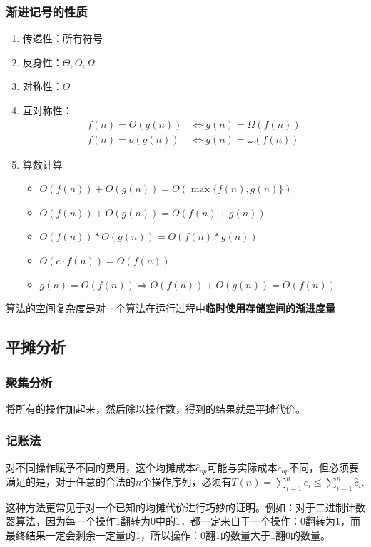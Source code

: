 \documentclass[./../main.tex]{subfiles} %
\begin{document}
\subsubsection{渐进记号的性质}
\begin{enumerate}
    \item 传递性：所有符号
    \item 反身性：$\Theta, O, \Omega$
    \item 对称性：$\Theta$
    \item 互对称性：
    \begin{align*}
        f(n)=O(g(n))&\iff g(n)=\Omega(f(n))\\
        f(n)=o(g(n))&\iff g(n)=\omega(f(n))
    \end{align*}
    \item 算数计算
    \begin{itemize}
        \item $O(f(n))+O(g(n))=O(\max\{f(n),g(n)\})$
        \item $O(f(n))+O(g(n))=O(f(n)+g(n))$
        \item $O(f(n))*O(g(n))=O(f(n)*g(n))$
        \item $O(c\cdot f(n))=O(f(n))$
        \item $g(n)=O(f(n))\Rightarrow O(f(n))+O(g(n))=O(f(n))$
    \end{itemize}
\end{enumerate}

算法的空间复杂度是对一个算法在运行过程中\textbf{临时使用存储空间的渐进度量}

\subsection{平摊分析}
\subsubsection{聚集分析}
将所有的操作加起来，然后除以操作数，得到的结果就是平摊代价。

\subsubsection{记账法}
对不同操作赋予不同的费用，这个均摊成本$\hat c_{op}$可能与实际成本$c_{op}$不同，但必须要满足的是，对于任意的合法的$n$个操作序列，必须有$T(n)=\sum_{i=1}^nc_i\le \sum_{i=1}^n\hat c_i$.

这种方法更常见于对一个已知的均摊代价进行巧妙的证明。例如：对于二进制计数器算法，因为每一个操作1翻转为0中的1，都一定来自于一个操作：0翻转为1，而最终结果一定会剩余一定量的1，所以操作：0翻1的数量大于1翻0的数量。
\end{document}

